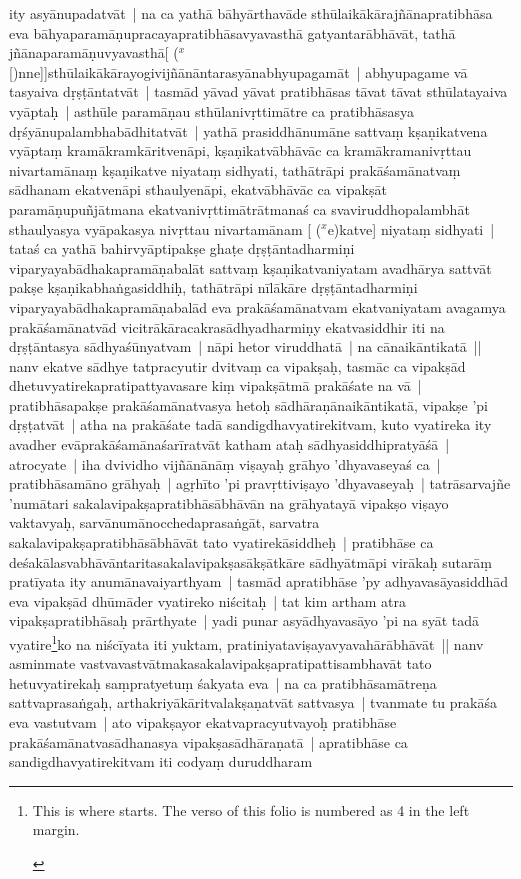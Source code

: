 \documentclass[article,12pt,a4paper]{memoir}
\newcommand{\corr}[1]{($^{x}$#1)}
\begin{document}
	  \pstart ity asyānupadatvāt | na ca yathā bāhyārthavāde sthūlaikākārajñānapratibhāsa eva bāhyaparamāṇupracayapratibhāsavyavasthā gatyantarābhāvāt, tathā jñānaparamāṇuvyavasthā[ {\corr [nne]}]sthūlaikākārayogivijñānāntarasyānabhyupagamāt | abhyupagame vā tasyaiva dṛṣṭāntatvāt | tasmād yāvad yāvat pratibhāsas tāvat tāvat sthūlatayaiva vyāptaḥ | asthūle paramāṇau sthūlanivṛttimātre ca pratibhāsasya dṛśyānupalambhabādhitatvāt | yathā prasiddhānumāne sattvaṃ kṣaṇikatvena vyāptaṃ kramākramkāritvenāpi, kṣaṇikatvābhāvāc ca kramākramanivṛttau nivartamānaṃ kṣaṇikatve niyataṃ sidhyati, tathātrāpi prakāśamānatvaṃ sādhanam ekatvenāpi sthaulyenāpi, ekatvābhāvāc ca vipakṣāt paramāṇupuñjātmana ekatvanivṛttimātrātmanaś ca svaviruddhopalambhāt sthaulyasya vyāpakasya nivṛttau nivartamānam [ {\corr ekatve}] niyataṃ sidhyati | tataś ca yathā bahirvyāptipakṣe ghaṭe dṛṣṭāntadharmiṇi viparyayabādhakapramāṇabalāt sattvaṃ kṣaṇikatvaniyatam avadhārya sattvāt pakṣe kṣaṇikabhaṅgasiddhiḥ, tathātrāpi nīlākāre dṛṣṭāntadharmiṇi viparyayabādhakapramāṇabalād eva prakāśamānatvam ekatvaniyatam avagamya prakāśamānatvād vicitrākāracakrasādhyadharmiṇy ekatvasiddhir iti na dṛṣṭāntasya sādhyaśūnyatvam | nāpi hetor viruddhatā | na cānaikāntikatā || \label{thakur75-130.33} nanv ekatve sādhye tatpracyutir dvitvaṃ ca vipakṣaḥ, tasmāc ca vipakṣād dhetuvyatirekapratipattyavasare kiṃ vipakṣātmā prakāśate na vā | pratibhāsapakṣe prakāśamānatvasya hetoḥ sādhāraṇānaikāntikatā, vipakṣe 'pi dṛṣṭatvāt | atha na prakāśate tadā sandigdhavyatirekitvam, kuto vyatireka ity avadher evāprakāśamānaśarīratvāt katham ataḥ sādhyasiddhipratyāśā | \label{thakur75-131.4} atrocyate | iha dvividho vijñānānāṃ viṣayaḥ grāhyo 'dhyavaseyaś ca | pratibhāsamāno grāhyaḥ | agṛhīto 'pi pravṛttiviṣayo 'dhyavaseyaḥ | tatrāsarvajñe 'numātari sakalavipakṣapratibhāsābhāvān na grāhyatayā vipakṣo viṣayo vaktavyaḥ, sarvānumānocchedaprasaṅgāt, sarvatra sakalavipakṣapratibhāsābhāvāt tato vyatirekāsiddheḥ | pratibhāse ca deśakālasvabhāvāntaritasakalavipakṣasākṣātkāre sādhyātmāpi virākaḥ sutarāṃ pratīyata ity anumānavaiyarthyam | tasmād apratibhāse 'py adhyavasāyasiddhād eva vipakṣād dhūmāder vyatireko niścitaḥ | tat kim artham atra vipakṣapratibhāsaḥ prārthyate | yadi punar asyādhyavasāyo 'pi na syāt tadā vyatire\label{capv-np-4a-start}\footnote{\begin{english}This is where \cite{capv-np} starts. The verso of this folio is numbered as 4 in the left margin.\end{english}}ko na niścīyata iti yuktam, pratiniyataviṣayavyavahārābhāvāt || \label{thakur75-131.13} nanv asminmate vastvavastvātmakasakalavipakṣapratipattisambhavāt tato hetuvyatirekaḥ saṃpratyetuṃ śakyata eva | na ca pratibhāsamātreṇa sattvaprasaṅgaḥ, arthakriyākāritvalakṣaṇatvāt sattvasya | tvanmate tu prakāśa eva vastutvam | ato vipakṣayor ekatvapracyutvayoḥ pratibhāse prakāśamānatvasādhanasya vipakṣasādhāraṇatā | apratibhāse ca sandigdhavyatirekitvam iti codyaṃ duruddharam 
\end{document}
